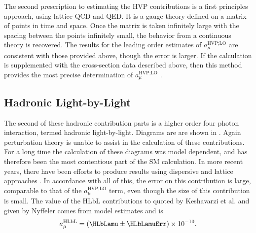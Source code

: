 The second prescription to estimating the HVP contributions is a first principles approach, using lattice QCD and QED. It is a gauge theory defined on a matrix of points in time and space. Once the matrix is taken infinitely large with the spacing between the points infinitely small, the behavior from a continuous theory is recovered. The results for the leading order estimates of $a_{\mu}^{\text{HVP;LO}}$ are consistent with those provided above, though the error is larger. If the calculation is supplemented with the cross-section data described above, then this method provides the most precise determination of $a_{\mu}^{\text{HVP;LO}}$ \cite{Lattice}.



\subsection*{Hadronic Light-by-Light}
\label{subsec:HLbL}

The second of these hadronic contribution parts is a higher order four photon interaction, termed hadronic light-by-light. Diagrams are are shown in . Again perturbation theory is unable to assist in the calculation of these contributions. For a long time the calculation of these diagrams was model dependent, and has therefore been the most contentious part of the SM calculation. In more recent years, there have been efforts to produce results using dispersive and lattice approaches \cite{HLbL1}. In accordance with all of this, the error on this contribution is large, comparable to that of the $a_{\mu}^{\text{HVP;LO}}$ term, even though the size of this contribution is small. The value of the HLbL contributions to \amu quoted by Keshavarzi et al. and given by Nyffeler \cite{Keshavarzi:2018mgv,Nyffeler:2016gnb} comes from model estimates and is 
		\begin{align}
            a_{\mu}^{\text{HLbL}} = (\HLbLamu \pm \HLbLamuErr) \times 10^{-10}.
		\end{align}


